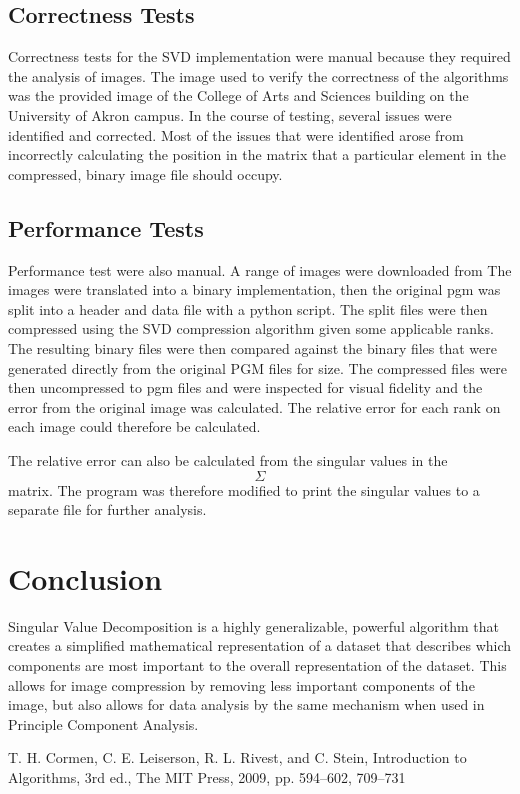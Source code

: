 \documentclass[conference]{IEEEtran}
\begin{document}
\subsection{Correctness Tests}
Correctness tests for the SVD implementation were manual because they required the analysis of images.
The image used to verify the correctness of the algorithms was the provided image of the College of 
Arts and Sciences building on the University of Akron campus. In the course of testing, several issues
were identified and corrected. Most of the issues that were identified arose from incorrectly calculating
the position in the matrix that a particular element in the compressed, binary image file should occupy. 

\subsection{Performance Tests}\label{perf_explanation} %
Performance test were also manual. A range of images were downloaded from %
The images were translated into a binary implementation, then the original pgm was split 
into a header and data file with a python script. The split files were then compressed 
using the SVD compression algorithm given some applicable ranks. The resulting binary 
files were then compared against the binary files that were generated directly from the 
original PGM files for size. The compressed files were then uncompressed to pgm files 
and were inspected for visual fidelity and the error from the original image was 
calculated. The relative error for each rank on each image could therefore be calculated.

The relative error can also be calculated from the singular values in the $$\Sigma$$ matrix.
The program was therefore modified to print the singular values to a separate file for further
analysis.


\section{Conclusion}
Singular Value Decomposition is a highly generalizable, powerful algorithm that creates a simplified 
mathematical representation of a dataset that describes which components are most important to the 
overall representation of the dataset. This allows for image compression by removing less important 
components of the image, but also allows for data analysis by the same mechanism when used in Principle
Component Analysis.  


\begin{thebibliography}{00}
     T. H. Cormen, C. E. Leiserson, R. L. Rivest, and C. Stein, Introduction to Algorithms, 3rd ed., The MIT Press, 2009, pp. 594--602, 709--731 
\end{thebibliography}
\end{document}
